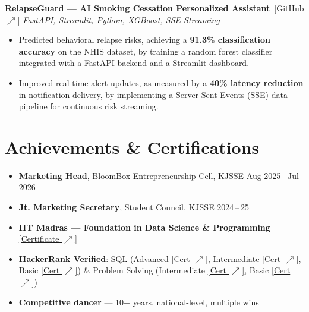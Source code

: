 \documentclass[9pt]{article}
\newcommand{\ghlink}[1]{\,[\href{#1}{\underline{\footnotesize GitHub $\nearrow$}}]}
\newcommand{\drivelink}[2]{\href{#1}{#2}}
\begin{document}
\vspace{3pt}
\textbf{RelapseGuard --- AI Smoking Cessation Personalized Assistant}%
\ghlink{https://github.com/chapranishika/RelapseGuard}
\hfill{\small\textit{FastAPI, Streamlit, Python, XGBoost, SSE Streaming}}
\begin{itemize}
  \item Predicted behavioral relapse risks, achieving a \textbf{91.3\% classification accuracy} on the NHIS dataset, by training a random forest classifier integrated with a FastAPI backend and a Streamlit dashboard.
  \item Improved real-time alert updates, as measured by a \textbf{40\% latency reduction} in notification delivery, by implementing a Server-Sent Events (SSE) data pipeline for continuous risk streaming.
\end{itemize}

\section{Achievements \& Certifications}
\begin{itemize}
  \item \textbf{Marketing Head}, BloomBox Entrepreneurship Cell, KJSSE \hfill Aug 2025\,--\,Jul 2026
  \item \textbf{Jt. Marketing Secretary}, Student Council, KJSSE \hfill 2024\,--\,25
  \item \textbf{IIT Madras --- Foundation in Data Science \& Programming} 
  \drivelink{https://drive.google.com/file/d/1Ny9y4ChDDEAulTF4YXvXGWswUJm64CIj/view?usp=sharing}{[\underline{Certificate $\nearrow$}]}
  \item \textbf{HackerRank Verified}: SQL (Advanced \drivelink{https://www.hackerrank.com/certificates/6fc2d2a2c5ea}{[\underline{Cert $\nearrow$}]}, Intermediate \drivelink{https://www.hackerrank.com/certificates/6d53fd58f424}{[\underline{Cert $\nearrow$}]}, Basic \drivelink{https://www.hackerrank.com/certificates/935cabd71fa9}{[\underline{Cert $\nearrow$}]}) \& Problem Solving (Intermediate \drivelink{https://www.hackerrank.com/certificates/322636ada18b}{[\underline{Cert $\nearrow$}]}, Basic \drivelink{https://www.hackerrank.com/certificates/277edf5ed344}{[\underline{Cert $\nearrow$}]})
  \item \textbf{Competitive dancer} --- 10+ years, national-level, multiple wins
\end{itemize}
\end{document}
